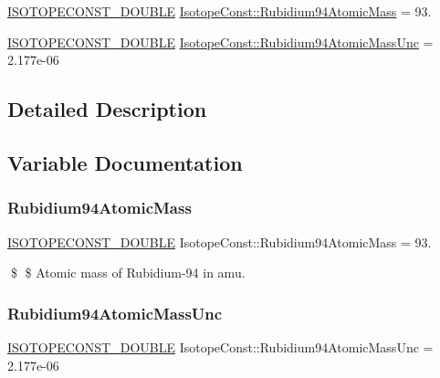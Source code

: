 \begin{DoxyCompactItemize}
\item 
\mbox{\hyperlink{group___isotope_const-_macros_ga8f45a7272ce02c0b4c65c44636ed719a}{I\+S\+O\+T\+O\+P\+E\+C\+O\+N\+S\+T\+\_\+\+D\+O\+U\+B\+LE}} \mbox{\hyperlink{group___isotope_const-_rubidium-_rb94_gad8eaa86589bc0869a2cc17c219ec68cb}{Isotope\+Const\+::\+Rubidium94\+Atomic\+Mass}} = 93.
\item 
\mbox{\hyperlink{group___isotope_const-_macros_ga8f45a7272ce02c0b4c65c44636ed719a}{I\+S\+O\+T\+O\+P\+E\+C\+O\+N\+S\+T\+\_\+\+D\+O\+U\+B\+LE}} \mbox{\hyperlink{group___isotope_const-_rubidium-_rb94_gacb9c52020ffeb2066fe745f74046731c}{Isotope\+Const\+::\+Rubidium94\+Atomic\+Mass\+Unc}} = 2.\+177e-\/06
\end{DoxyCompactItemize}


\subsection{Detailed Description}


\subsection{Variable Documentation}
\mbox{\label{group___isotope_const-_rubidium-_rb94_gad8eaa86589bc0869a2cc17c219ec68cb}} 
\subsubsection{\texorpdfstring{Rubidium94\+Atomic\+Mass}{Rubidium94AtomicMass}}
{\footnotesize\ttfamily \mbox{\hyperlink{group___isotope_const-_macros_ga8f45a7272ce02c0b4c65c44636ed719a}{I\+S\+O\+T\+O\+P\+E\+C\+O\+N\+S\+T\+\_\+\+D\+O\+U\+B\+LE}} Isotope\+Const\+::\+Rubidium94\+Atomic\+Mass = 93.}

\$ \$ Atomic mass of Rubidium-\/94 in amu. \mbox{\label{group___isotope_const-_rubidium-_rb94_gacb9c52020ffeb2066fe745f74046731c}} 
\subsubsection{\texorpdfstring{Rubidium94\+Atomic\+Mass\+Unc}{Rubidium94AtomicMassUnc}}
{\footnotesize\ttfamily \mbox{\hyperlink{group___isotope_const-_macros_ga8f45a7272ce02c0b4c65c44636ed719a}{I\+S\+O\+T\+O\+P\+E\+C\+O\+N\+S\+T\+\_\+\+D\+O\+U\+B\+LE}} Isotope\+Const\+::\+Rubidium94\+Atomic\+Mass\+Unc = 2.\+177e-\/06}


